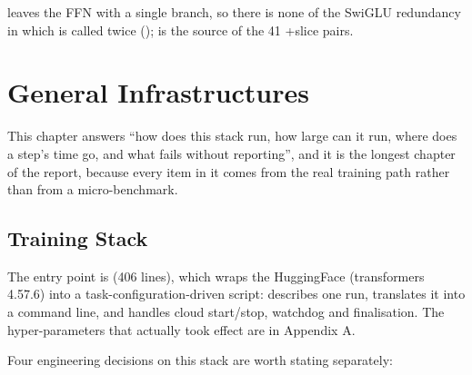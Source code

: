\documentclass[11pt,openany]{article}
\begin{document}
\linebreak[0]\linebreak[0] leaves the FFN with a single branch, so there is none of the SwiGLU
redundancy in which  is called twice (\linebreak[0]);
\linebreak[0]\linebreak[0]\linebreak[0] is the source of the 41 +slice pairs.

\section{General Infrastructures}

This chapter answers ``how does this stack run, how large can it run, where does a step's time go,
and what fails without reporting'', and it is the longest chapter of the report, because every
item in it comes from the real training path rather than from a micro-benchmark.

\subsection{Training Stack}

The entry point is \linebreak[0] (406 lines), which wraps the HuggingFace
 (transformers 4.57.6) into a task-configuration-driven script: 
describes one run,  translates it into a command line, and
\linebreak[0]\linebreak[0] handles cloud start/stop, watchdog and finalisation. The
hyper-parameters that actually took effect are in Appendix A.

Four engineering decisions on this stack are worth stating separately:
\end{document}
